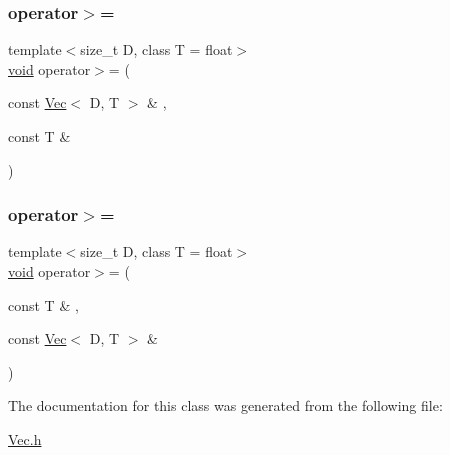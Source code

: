 \subsubsection{\texorpdfstring{operator$>$=}{operator>=}\hspace{0.1cm}{\footnotesize\ttfamily [1/2]}}
{\footnotesize\ttfamily template$<$size\+\_\+t D, class T = float$>$ \\
\hyperlink{namespacetrimesh_a784ddfd979e1c579bda795a8edfc3f43}{void} operator$>$= (\begin{DoxyParamCaption}\item[{const \hyperlink{classtrimesh_1_1Vec}{Vec}$<$ D, T $>$ \&}]{,  }\item[{const T \&}]{ }\end{DoxyParamCaption})\hspace{0.3cm}{\ttfamily [friend]}}

\mbox{\label{classtrimesh_1_1Vec_aa2cf9fbecb5838b5d4b8e04030e56fb1}} 
\subsubsection{\texorpdfstring{operator$>$=}{operator>=}\hspace{0.1cm}{\footnotesize\ttfamily [2/2]}}
{\footnotesize\ttfamily template$<$size\+\_\+t D, class T = float$>$ \\
\hyperlink{namespacetrimesh_a784ddfd979e1c579bda795a8edfc3f43}{void} operator$>$= (\begin{DoxyParamCaption}\item[{const T \&}]{,  }\item[{const \hyperlink{classtrimesh_1_1Vec}{Vec}$<$ D, T $>$ \&}]{ }\end{DoxyParamCaption})\hspace{0.3cm}{\ttfamily [friend]}}



The documentation for this class was generated from the following file\+:\begin{DoxyCompactItemize}
\item 
\hyperlink{Vec_8h}{Vec.\+h}\end{DoxyCompactItemize}
